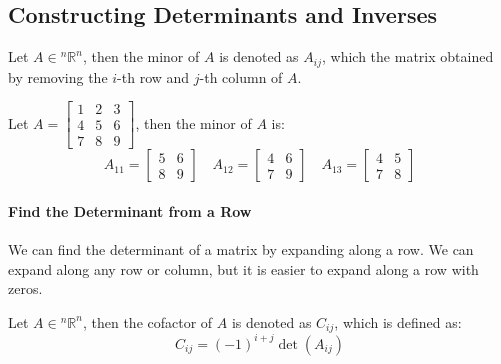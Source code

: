 \documentclass[11pt]{article}
\begin{document}
\subsection{Constructing Determinants and Inverses}
\begin{definition}
    Let $A \in {^n\mathbb{R}^n}$, then the minor of $A$ is denoted as $A_{ij}$, which the matrix obtained by removing the $i$-th row and $j$-th column of $A$.
\end{definition}
\begin{example}
    Let $A = \begin{bmatrix} 1 & 2 & 3 \\ 4 & 5 & 6 \\ 7 & 8 & 9 \end{bmatrix}$, then the minor of $A$ is:
    $$ A_{11} = \begin{bmatrix} 5 & 6 \\ 8 & 9 \end{bmatrix} \quad A_{12} = \begin{bmatrix} 4 & 6 \\ 7 & 9 \end{bmatrix} \quad A_{13} = \begin{bmatrix} 4 & 5 \\ 7 & 8 \end{bmatrix} $$
\end{example}
\paragraph{Find the Determinant from a Row} We can find the determinant of a matrix by expanding along a row. We can expand along any row or column, but it is easier to expand along a row with zeros.
\begin{definition}[Cofactor]
    Let $A \in  {^n\mathbb{R}^n}$, then the cofactor of $A$ is denoted as $C_{ij}$, which is defined as:
    \begin{equation}
        C_{ij} = (-1)^{i+j}\det(A_{ij})
    \end{equation}
\end{definition}
\end{document}
